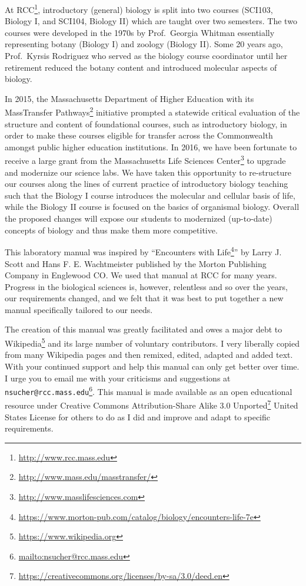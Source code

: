 \documentclass[]{book}
\let\rmarkdownfootnote\footnote%
\def\footnote{\protect\rmarkdownfootnote}
\renewcommand{\href}[2]{#2\footnote{\url{#1}}}
\theoremstyle{definition}
\theoremstyle{definition}
\theoremstyle{definition}
\theoremstyle{remark}
\begin{document}
\begin{multicols}{2}
At \href{http://www.rcc.mass.edu}{RCC}, introductory (general) biology
is split into two courses (SCI103, Biology I, and SCI104, Biology II)
which are taught over two semesters. The two courses were developed in
the 1970s by Prof.~Georgia Whitman essentially representing botany
(Biology I) and zoology (Biology II). Some 20 years ago, Prof.~Kyrsis
Rodriguez who served as the biology course coordinator until her
retirement reduced the botany content and introduced molecular aspects
of biology.

In 2015, the Massachusetts Department of Higher Education with its
\href{http://www.mass.edu/masstransfer/}{MassTransfer Pathways}
initiative prompted a statewide critical evaluation of the structure and
content of foundational courses, such as introductory biology, in order
to make these courses eligible for transfer across the Commonwealth
amongst public higher education institutions. In 2016, we have been
fortunate to receive a large grant from the
\href{http://www.masslifesciences.com}{Massachusetts Life Sciences
Center} to upgrade and modernize our science labs. We have taken this
opportunity to re-structure our courses along the lines of current
practice of introductory biology teaching such that the Biology I course
introduces the molecular and cellular basis of life, while the Biology
II course is focused on the basics of organismal biology. Overall the
proposed changes will expose our students to modernized (up-to-date)
concepts of biology and thus make them more competitive.

This laboratory manual was inspired by
``\href{https://www.morton-pub.com/catalog/biology/encounters-life-7e}{Encounters
with Life}'' by Larry J. Scott and Hans F. E. Wachtmeister published by
the Morton Publishing Company in Englewood CO. We used that manual at
RCC for many years. Progress in the biological sciences is, however,
relentless and so over the years, our requirements changed, and we felt
that it was best to put together a new manual specifically tailored to
our needs.

The creation of this manual was greatly facilitated and owes a major
debt to \href{https://www.wikipedia.org}{Wikipedia} and its large number of voluntary contributors. I very
liberally copied from many Wikipedia pages and then remixed, edited,
adapted and added text. With your continued support and help this manual
can only get better over time. I urge you to email me with your
criticisms and suggestions at
\href{mailto:nsucher@rcc.mass.edu}{\nolinkurl{nsucher@rcc.mass.edu}}.
This manual is made available as an open educational resource under
\href{https://creativecommons.org/licenses/by-sa/3.0/deed.en}{Creative
Commons Attribution-Share Alike 3.0 Unported} United States License for
others to do as I did and improve and adapt to specific requirements.


\end{multicols}
\end{document}
